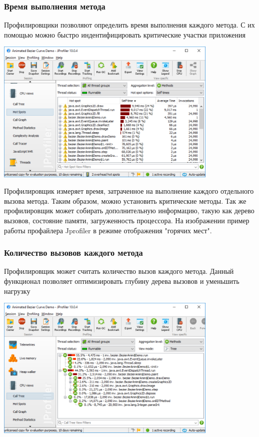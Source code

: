 \documentclass{../industrial-development}
\begin{document}
\begin{frame} \frametitle{Время выполнения метода}
	\begin{block}{}
		Профилировщики позволяют \alert{определить время выполнения} каждого метода. С их помощью можно быстро индентифицировать критические участки приложения
	\end{block}
	\centerline{\includegraphics[width=0.8\textwidth]{invocations.pdf}}
\end{frame}

\lecturenotes
Профилировщик измеряет время, затраченное на выполнение каждого отдельного вызова метода. Таким образом, можно установить критические методы. Так же профилировщик может собирать дополнительную информацию, такую как дерево вызовов, состояние памяти, загруженность процессора. На изображении пример работы профайлера Jprofiler в режиме отображения "горячих мест".

\begin{frame} \frametitle{Количество вызовов каждого метода}
	\begin{block}{}
		Профилировщик может \alert{считать количество вызов} каждого метода. Данный функционал позволяет оптимизировать глубину дерева вызовов и уменьшить нагрузку
	\end{block}
	\centerline{\includegraphics[width=0.8\textwidth]{calltree.pdf}}
\end{frame}
\end{document}
